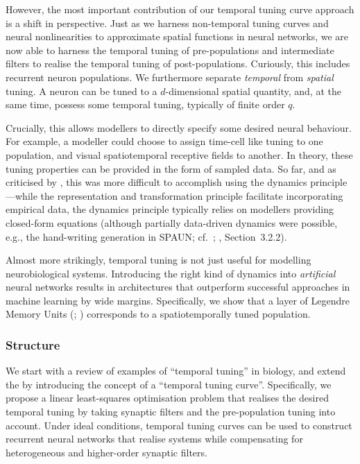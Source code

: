 However, the most important contribution of our temporal tuning curve approach is a shift in perspective.
Just as we harness non-temporal tuning curves and neural nonlinearities to approximate spatial functions in neural networks, we are now able to harness the temporal tuning of pre-populations and intermediate filters to realise the temporal tuning of post-populations.
Curiously, this includes recurrent neuron populations.
We furthermore separate \emph{temporal} from \emph{spatial} tuning.
A neuron can be tuned to a $d$-dimensional spatial quantity, and, at the same time, possess some temporal tuning, typically of finite order $q$.

Crucially, this allows modellers to directly specify some desired neural behaviour.
For example, a modeller could choose to assign time-cell like tuning \citep{pastalkova2008internally,tiganj2016sequential} to one population, and visual spatiotemporal receptive fields \citep{carandini1999linearity} to another.
In theory, these tuning properties can be provided in the form of sampled data.
So far, and as criticised by \citet{nicola2017supervised}, this was more difficult to accomplish using the \NEF dynamics principle---while the representation and transformation principle facilitate incorporating empirical data, the dynamics principle typically relies on modellers providing closed-form equations (although partially data-driven dynamics were possible, e.g., the hand-writing generation in SPAUN; cf.~\cite{eliasmith2012largescale}; \cite{choo2018spaun}, Section~3.2.2).

Almost more strikingly, temporal tuning is not just useful for modelling neurobiological systems.
Introducing the right kind of dynamics into \emph{artificial} neural networks results in architectures that outperform successful approaches in machine learning by wide margins.
Specifically, we show that a layer of Legendre Memory Units (\LMUpl; \cite{voelker2019lmu}) corresponds to a spatiotemporally tuned \NEF population.

\subsubsection{Structure}
We start  with a review of examples of \enquote{temporal tuning} in biology, and extend the \NEF by introducing the concept of a \enquote{temporal tuning curve}.
Specifically, we propose a linear least-squares optimisation problem that realises the desired temporal tuning by taking synaptic filters and the pre-population tuning into account.
Under ideal conditions, temporal tuning curves can be used to construct recurrent neural networks that realise \LTI systems while compensating for heterogeneous and higher-order synaptic filters.

